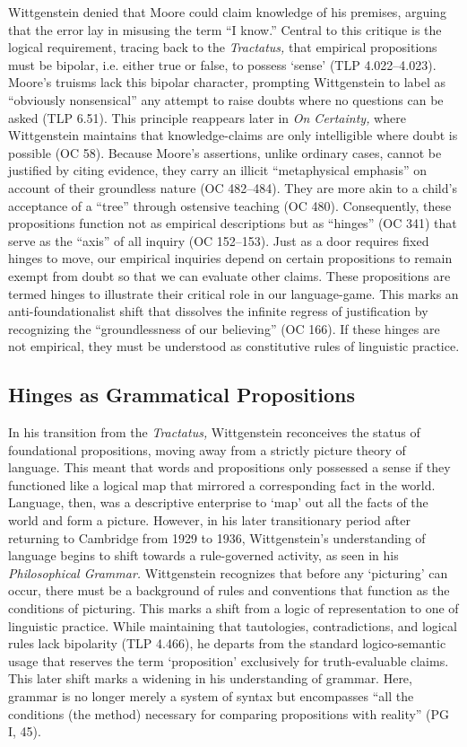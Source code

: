 Wittgenstein denied that Moore could claim knowledge of his premises,
arguing that the error lay in misusing the term ``I know.'' Central to
this critique is the logical requirement, tracing back to the
\emph{Tractatus,} that empirical propositions must be bipolar, i.e.
either true or false, to possess `sense' (TLP 4.022--4.023). Moore's
truisms lack this bipolar character\emph{,} prompting Wittgenstein to
label as ``obviously nonsensical'' any attempt to raise doubts where no
questions can be asked (TLP 6.51). This principle reappears later in
\emph{On Certainty,} where Wittgenstein maintains that knowledge-claims
are only intelligible where doubt is possible (OC 58). Because Moore's
assertions, unlike ordinary cases, cannot be justified by citing
evidence, they carry an illicit ``metaphysical emphasis'' on account of
their groundless nature (OC 482--484). They are more akin to a child's
acceptance of a ``tree'' through ostensive teaching (OC 480).
Consequently, these propositions function not as empirical descriptions
but as ``hinges'' (OC 341) that serve as the ``axis'' of all inquiry (OC
152--153). Just as a door requires fixed hinges to move, our empirical
inquiries depend on certain propositions to remain exempt from doubt so
that we can evaluate other claims. These propositions are termed hinges
to illustrate their critical role in our language-game. This marks an
anti-foundationalist shift that dissolves the infinite regress of
justification by recognizing the ``groundlessness of our believing'' (OC
166). If these hinges are not empirical, they must be understood as
constitutive rules of linguistic practice.

\subsection{Hinges as Grammatical Propositions}

In his transition from the \emph{Tractatus,} Wittgenstein reconceives
the status of foundational propositions, moving away from a strictly
picture theory of language. This meant that words and propositions only
possessed a sense if they functioned like a logical map that mirrored a
corresponding fact in the world. Language, then, was a descriptive
enterprise to `map' out all the facts of the world and form a picture.
However, in his later transitionary period after returning to Cambridge
from 1929 to 1936, Wittgenstein's understanding of language begins to
shift towards a rule-governed activity, as seen in his
\emph{Philosophical Grammar.} Wittgenstein recognizes that before any
`picturing' can occur, there must be a background of rules and
conventions that function as the conditions of picturing. This marks a
shift from a logic of representation to one of linguistic practice.
While maintaining that tautologies, contradictions, and logical rules
lack bipolarity (TLP 4.466), he departs from the standard
logico-semantic usage that reserves the term `proposition' exclusively
for truth-evaluable claims. This later shift marks a widening in his
understanding of grammar. Here, grammar is no longer merely a system of
syntax but encompasses ``all the conditions (the method) necessary for
comparing propositions with reality'' (PG I, 45).


